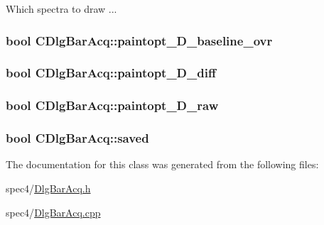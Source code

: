 Which spectra to draw ... 

\hypertarget{classCDlgBarAcq_afdee9e19c60ee22b8464cebc7685b573}{
\subsubsection[{paintopt\_\-D\_\-baseline\_\-ovr}]{\setlength{\rightskip}{0pt plus 5cm}bool {\bf CDlgBarAcq::paintopt\_\-D\_\-baseline\_\-ovr}}}
\label{classCDlgBarAcq_afdee9e19c60ee22b8464cebc7685b573}
\hypertarget{classCDlgBarAcq_ac7f914a7e5f6dfc66404db04c237929d}{
\subsubsection[{paintopt\_\-D\_\-diff}]{\setlength{\rightskip}{0pt plus 5cm}bool {\bf CDlgBarAcq::paintopt\_\-D\_\-diff}}}
\label{classCDlgBarAcq_ac7f914a7e5f6dfc66404db04c237929d}
\hypertarget{classCDlgBarAcq_a975c3cd2e0dfb9c7dc4ac41c36d20525}{
\subsubsection[{paintopt\_\-D\_\-raw}]{\setlength{\rightskip}{0pt plus 5cm}bool {\bf CDlgBarAcq::paintopt\_\-D\_\-raw}}}
\label{classCDlgBarAcq_a975c3cd2e0dfb9c7dc4ac41c36d20525}
\hypertarget{classCDlgBarAcq_a75183d3a82a56dd75349d200f3ef00d4}{
\subsubsection[{saved}]{\setlength{\rightskip}{0pt plus 5cm}bool {\bf CDlgBarAcq::saved}}}
\label{classCDlgBarAcq_a75183d3a82a56dd75349d200f3ef00d4}


The documentation for this class was generated from the following files:\begin{DoxyCompactItemize}
\item 
spec4/\hyperlink{DlgBarAcq_8h}{DlgBarAcq.h}\item 
spec4/\hyperlink{DlgBarAcq_8cpp}{DlgBarAcq.cpp}\end{DoxyCompactItemize}
